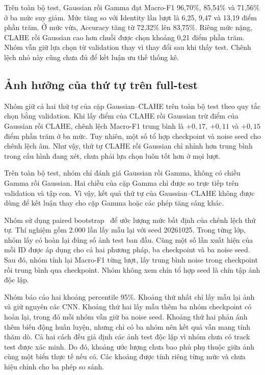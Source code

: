 Trên toàn bộ test, Gaussian rồi Gamma đạt Macro-F1 96,70\%, 85,54\% và 71,56\% ở ba mức suy giảm. Mức tăng so với Identity lần lượt là 6,25, 9,47 và 13,19 điểm phần trăm. Ở mức vừa, Accuracy tăng từ 72,32\% lên 83,75\%. Riêng mức nặng, CLAHE rồi Gaussian cao hơn chuỗi được chọn khoảng 0,21 điểm phần trăm. Nhóm vẫn giữ lựa chọn từ validation thay vì thay đổi sau khi thấy test. Chênh lệch nhỏ này cũng chưa đủ để kết luận ưu thế thống kê.

\subsection{Ảnh hưởng của thứ tự trên full-test}
Nhóm giữ cả hai thứ tự của cặp Gaussian--CLAHE trên toàn bộ test theo quy tắc chọn bằng validation. Khi lấy điểm của CLAHE rồi Gaussian trừ điểm của Gaussian rồi CLAHE, chênh lệch Macro-F1 trung bình là $+0,17$, $+0,11$ và $+0,15$ điểm phần trăm ở ba mức. Tuy nhiên, một số tổ hợp checkpoint và noise seed cho chênh lệch âm. Như vậy, thứ tự CLAHE rồi Gaussian chỉ nhỉnh hơn trung bình trong cấu hình đang xét, chưa phải lựa chọn luôn tốt hơn ở mọi lượt.

Trên toàn bộ test, nhóm chỉ đánh giá Gaussian rồi Gamma, không có chiều Gamma rồi Gaussian. Hai chiều của cặp Gamma chỉ được so trực tiếp trên validation và tập con. Vì vậy, kết quả thứ tự của Gaussian--CLAHE không được dùng để kết luận thay cho cặp Gamma hoặc các phép tăng sáng khác.

Nhóm sử dụng paired bootstrap~\cite{bootstrap} để ước lượng mức bất định của chênh lệch thứ tự. Thí nghiệm gồm 2.000 lần lấy mẫu lại với seed 20261025. Trong từng lớp, nhóm lấy có hoàn lại đúng số ảnh test ban đầu. Cùng một số lần xuất hiện của mỗi ID được áp dụng cho cả hai phương pháp, ba checkpoint và ba noise seed. Sau đó, nhóm tính lại Macro-F1 từng lượt, lấy trung bình noise trong checkpoint rồi trung bình qua checkpoint. Nhóm không xem chín tổ hợp seed là chín tập ảnh độc lập.

Nhóm báo cáo hai khoảng percentile 95\%. Khoảng thứ nhất chỉ lấy mẫu lại ảnh và giữ nguyên các CNN. Khoảng thứ hai lấy mẫu thêm ba nhóm checkpoint có hoàn lại, trong đó mỗi nhóm vẫn giữ ba noise seed. Khoảng thứ hai phản ánh thêm biến động huấn luyện, nhưng chỉ có ba nhóm nên kết quả vẫn mang tính thăm dò. Cả hai cách đều giả định các ảnh test độc lập vì nhóm chưa có track test được xác minh. Do đó, khoảng ước lượng chưa bao phủ phụ thuộc giữa ảnh cùng một biển thực tế nếu có. Các khoảng được tính riêng từng mức và chưa hiệu chỉnh cho ba phép so sánh.


